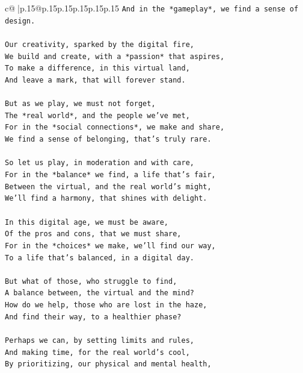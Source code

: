 \documentclass{article}
\begin{document}
{\begin{supertabular}{c@{$\;$}|p{.15\linewidth}@{}p{.15\linewidth}p{.15\linewidth}p{.15\linewidth}p{.15\linewidth}p{.15\linewidth}}
{{{\texttt{And in the *gameplay*, we find a sense of design.} \\
\\ 
\texttt{Our creativity, sparked by the digital fire,} \\
\texttt{We build and create, with a *passion* that aspires,} \\
\texttt{To make a difference, in this virtual land,} \\
\texttt{And leave a mark, that will forever stand.} \\
\\ 
\texttt{But as we play, we must not forget,} \\
\texttt{The *real world*, and the people we've met,} \\
\texttt{For in the *social connections*, we make and share,} \\
\texttt{We find a sense of belonging, that's truly rare.} \\
\\ 
\texttt{So let us play, in moderation and with care,} \\
\texttt{For in the *balance* we find, a life that's fair,} \\
\texttt{Between the virtual, and the real world's might,} \\
\texttt{We'll find a harmony, that shines with delight.} \\
\\ 
\texttt{In this digital age, we must be aware,} \\
\texttt{Of the pros and cons, that we must share,} \\
\texttt{For in the *choices* we make, we'll find our way,} \\
\texttt{To a life that's balanced, in a digital day.} \\
\\ 
\texttt{But what of those, who struggle to find,} \\
\texttt{A balance between, the virtual and the mind?} \\
\texttt{How do we help, those who are lost in the haze,} \\
\texttt{And find their way, to a healthier phase?} \\
\\ 
\texttt{Perhaps we can, by setting limits and rules,} \\
\texttt{And making time, for the real world's cool,} \\
\texttt{By prioritizing, our physical and mental health,} \\
}}}
\end{supertabular}}
\end{document}
